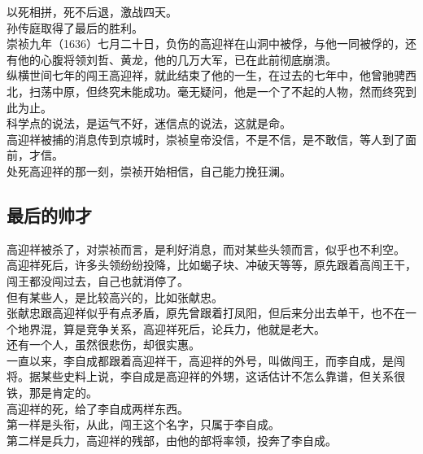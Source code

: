 \begin{multicols}{\theparacolNo}
以死相拼，死不后退，激战四天。\\

孙传庭取得了最后的胜利。\\

崇祯九年（1636）七月二十日，负伤的高迎祥在山洞中被俘，与他一同被俘的，还有他的心腹将领刘哲、黄龙，他的几万大军，已在此前彻底崩溃。\\

纵横世间七年的闯王高迎祥，就此结束了他的一生，在过去的七年中，他曾驰骋西北，扫荡中原，但终究未能成功。毫无疑问，他是一个了不起的人物，然而终究到此为止。\\

科学点的说法，是运气不好，迷信点的说法，这就是命。\\

高迎祥被捕的消息传到京城时，崇祯皇帝没信，不是不信，是不敢信，等人到了面前，才信。\\

处死高迎祥的那一刻，崇祯开始相信，自己能力挽狂澜。\\

\subsection{最后的帅才}
高迎祥被杀了，对崇祯而言，是利好消息，而对某些头领而言，似乎也不利空。\\

高迎祥死后，许多头领纷纷投降，比如蝎子块、冲破天等等，原先跟着高闯王干，闯王都没闯过去，自己也就消停了。\\

但有某些人，是比较高兴的，比如张献忠。\\

张献忠跟高迎祥似乎有点矛盾，原先曾跟着打凤阳，但后来分出去单干，也不在一个地界混，算是竞争关系，高迎祥死后，论兵力，他就是老大。\\

还有一个人，虽然很悲伤，却很实惠。\\

一直以来，李自成都跟着高迎祥干，高迎祥的外号，叫做闯王，而李自成，是闯将。据某些史料上说，李自成是高迎祥的外甥，这话估计不怎么靠谱，但关系很铁，那是肯定的。\\

高迎祥的死，给了李自成两样东西。\\

第一样是头衔，从此，闯王这个名字，只属于李自成。\\

第二样是兵力，高迎祥的残部，由他的部将率领，投奔了李自成。\\


\end{multicols}
